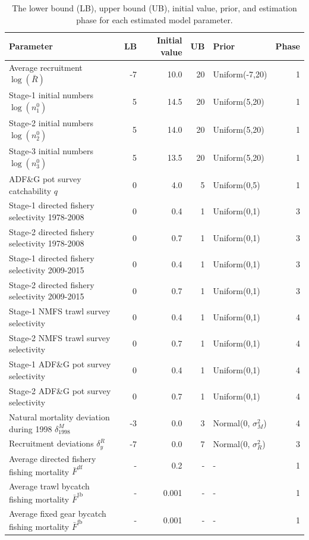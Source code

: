 \documentclass[]{article}
\begin{document}
\begin{table}[ht]
\centering
\caption{The lower bound (LB), upper bound (UB), initial value, prior, and estimation phase for each estimated model parameter.} 
\label{tab:bounds_pars}
\begin{tabular}{lrrrlr}
  \hline
  Parameter & LB & Initial value & UB & Prior & Phase \\ 
  \hline
  Average recruitment $\log (\bar{R})$ & -7 & 10.0 & 20 & Uniform(-7,20) & 1 \\ 
  Stage-1 initial numbers $\log (n^0_1)$ & 5 & 14.5 & 20 & Uniform(5,20) & 1 \\ 
  Stage-2 initial numbers $\log (n^0_2)$ & 5 & 14.0 & 20 & Uniform(5,20) & 1 \\ 
  Stage-3 initial numbers $\log (n^0_3)$ & 5 & 13.5 & 20 & Uniform(5,20) & 1 \\ 
  ADF\&G pot survey catchability $q$ & 0 & 4.0 & 5 & Uniform(0,5) & 1 \\ 
  Stage-1 directed fishery selectivity 1978-2008 & 0 & 0.4 & 1 & Uniform(0,1) & 3 \\ 
  Stage-2 directed fishery selectivity 1978-2008 & 0 & 0.7 & 1 & Uniform(0,1) & 3 \\ 
  Stage-1 directed fishery selectivity 2009-2015 & 0 & 0.4 & 1 & Uniform(0,1) & 3 \\ 
  Stage-2 directed fishery selectivity 2009-2015 & 0 & 0.7 & 1 & Uniform(0,1) & 3 \\ 
  Stage-1 NMFS trawl survey selectivity & 0 & 0.4 & 1 & Uniform(0,1) & 4 \\ 
  Stage-2 NMFS trawl survey selectivity & 0 & 0.7 & 1 & Uniform(0,1) & 4 \\ 
  Stage-1 ADF\&G pot survey selectivity & 0 & 0.4 & 1 & Uniform(0,1) & 4 \\ 
  Stage-2 ADF\&G pot survey selectivity & 0 & 0.7 & 1 & Uniform(0,1) & 4 \\ 
  Natural mortality deviation during 1998 $\delta^M_{1998}$ & -3 & 0.0 & 3 & Normal(0, $\sigma^2_M$) & 4 \\ 
  Recruitment deviations $\delta^R_y$ & -7 & 0.0 & 7 & Normal(0, $\sigma_R^2$) & 3 \\ 
  Average directed fishery fishing mortality $\bar{F}^\text{df}$                 & -  & 0.2 & - & - & 1 \\
  Average trawl bycatch fishing mortality $\bar{F}^\text{tb}$                 & -  & 0.001 & - & - & 1 \\
  Average fixed gear bycatch fishing mortality $\bar{F}^\text{fb}$                 & -  & 0.001 & - & - & 1 \\
  \hline
\end{tabular}
\end{table}
\end{document}
